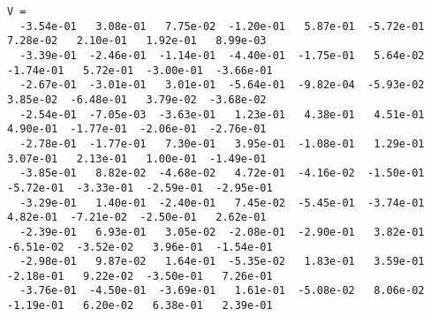 \documentclass{article}
\begin{document}
\begin{landscape}
\begin{lstlisting}[frame=single,basicstyle=\scriptsize]
V =
  -3.54e-01   3.08e-01   7.75e-02  -1.20e-01   5.87e-01  -5.72e-01   7.28e-02   2.10e-01   1.92e-01   8.99e-03
  -3.39e-01  -2.46e-01  -1.14e-01  -4.40e-01  -1.75e-01   5.64e-02  -1.74e-01   5.72e-01  -3.00e-01  -3.66e-01
  -2.67e-01  -3.01e-01   3.01e-01  -5.64e-01  -9.82e-04  -5.93e-02   3.85e-02  -6.48e-01   3.79e-02  -3.68e-02
  -2.54e-01  -7.05e-03  -3.63e-01   1.23e-01   4.38e-01   4.51e-01   4.90e-01  -1.77e-01  -2.06e-01  -2.76e-01
  -2.78e-01  -1.77e-01   7.30e-01   3.95e-01  -1.08e-01   1.29e-01   3.07e-01   2.13e-01   1.00e-01  -1.49e-01
  -3.85e-01   8.82e-02  -4.68e-02   4.72e-01  -4.16e-02  -1.50e-01  -5.72e-01  -3.33e-01  -2.59e-01  -2.95e-01
  -3.29e-01   1.40e-01  -2.40e-01   7.45e-02  -5.45e-01  -3.74e-01   4.82e-01  -7.21e-02  -2.50e-01   2.62e-01
  -2.39e-01   6.93e-01   3.05e-02  -2.08e-01  -2.90e-01   3.82e-01  -6.51e-02  -3.52e-02   3.96e-01  -1.54e-01
  -2.98e-01   9.87e-02   1.64e-01  -5.35e-02   1.83e-01   3.59e-01  -2.18e-01   9.22e-02  -3.50e-01   7.26e-01
  -3.76e-01  -4.50e-01  -3.69e-01   1.61e-01  -5.08e-02   8.06e-02  -1.19e-01   6.20e-02   6.38e-01   2.39e-01
\end{lstlisting}
\end{landscape}
\end{document}
